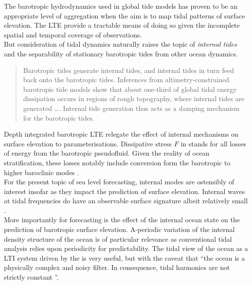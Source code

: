 
The barotropic hydrodynamics used in global tide models has proven to be an appropriate level of aggregation when the aim is to map tidal patterns of surface elevation.  The LTE provide a tractable means of doing so given the incomplete spatial and temporal coverage of observations.\\
But consideration of tidal dynamics naturally raises the topic of \emph{internal tides} and the separability of stationary barotropic tides from other ocean dynamics.\\
\begin{quotation}
Barotropic tides generate internal tides, and internal tides in turn feed back onto the barotropic tides. Inferences from altimetry-constrained barotropic tide models show that about one-third of global tidal energy dissipation occurs in regions of rough topography, where internal tides are generated \dots{}. Internal tide generation thus acts as a damping mechanism for the barotropic tides.\citep[pp22]{Arbic:hy}
\end{quotation}
Depth integrated barotropic LTE relegate the effect of internal mechanisms on surface elevation to parameterisations.  Dissipative stress $F$ in \label{E:LTE_momtm} stands for all losses of energy from the barotropic pseudofluid.  Given the reality of ocean stratification, these losses notably include conversion form the barotropic to higher baroclinic modes \cite[pp121] {gill1982atmosphere}. \\



For the present topic of sea level forecasting, internal modes are ostensibly of interest insofar as they impact the prediction of surface elevation.  Internal waves at tidal frequencies do have an observable surface signature albeit relatively small \cite{Ray:2011tj}.\\
More importantly for forecasting is the effect of the internal ocean state on the prediction of barotropic surface elevation.  A-periodic variation of the internal density structure of the ocean is of particular relevance as   conventional tidal analysis relies upon periodicity for predictability.     The tidal view of the ocean as a LTI system driven by the \ATGP{} is very useful, but with the caveat that ``the ocean is a physically complex and noisy filter.  In consequence, tidal harmonics are not strictly constant \citep[197]{Ray:2010jm}''.\\



